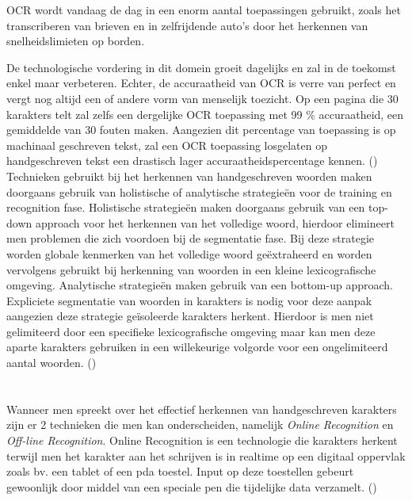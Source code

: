 OCR wordt vandaag de dag in een enorm aantal toepassingen gebruikt, zoals het transcriberen van brieven en in zelfrijdende auto's door het herkennen van snelheidslimieten op borden. 

De technologische vordering in dit domein groeit dagelijks en zal in de toekomst enkel maar verbeteren. Echter, de accuraatheid van OCR is verre van perfect en vergt nog altijd een of andere vorm van menselijk toezicht. Op een pagina die 30 karakters telt zal zelfs een dergelijke OCR toepassing met 99 \% accuraatheid, een gemiddelde van 30 fouten maken. Aangezien dit percentage van toepassing is op machinaal geschreven tekst, zal een OCR toepassing losgelaten op handgeschreven tekst een drastisch lager accuraatheidspercentage kennen. (\cite{Nagy1999}) 
\newline \newline
Technieken gebruikt bij het herkennen van handgeschreven woorden maken doorgaans gebruik van holistische of analytische strategieën voor de training en recognition fase. Holistische strategieën maken doorgaans gebruik van een top-down approach voor het herkennen van het volledige woord, hierdoor elimineert men problemen die zich voordoen bij de segmentatie fase. Bij deze strategie worden globale kenmerken van het volledige woord geëxtraheerd en worden vervolgens gebruikt bij herkenning van woorden in een kleine lexicografische omgeving. Analytische strategieën maken gebruik van een bottom-up approach. Expliciete segmentatie van woorden in karakters is nodig voor deze aanpak aangezien deze strategie geïsoleerde karakters herkent. Hierdoor is men niet gelimiteerd door een specifieke lexicografische omgeving maar kan men deze aparte karakters gebruiken in een willekeurige volgorde voor een ongelimiteerd aantal woorden. (\cite{NafizArica2001})

\section{}

Wanneer men spreekt over het effectief herkennen van handgeschreven karakters zijn er 2 technieken die men kan onderscheiden, namelijk \textit{Online Recognition} en \textit{Off-line Recognition}. Online Recognition is een technologie die karakters herkent terwijl men het karakter aan het schrijven is in realtime op een digitaal oppervlak zoals bv. een tablet of een pda toestel.  Input op deze toestellen gebeurt gewoonlijk door middel van een speciale pen die tijdelijke data verzamelt. (\cite{GergelyTimar2003})





